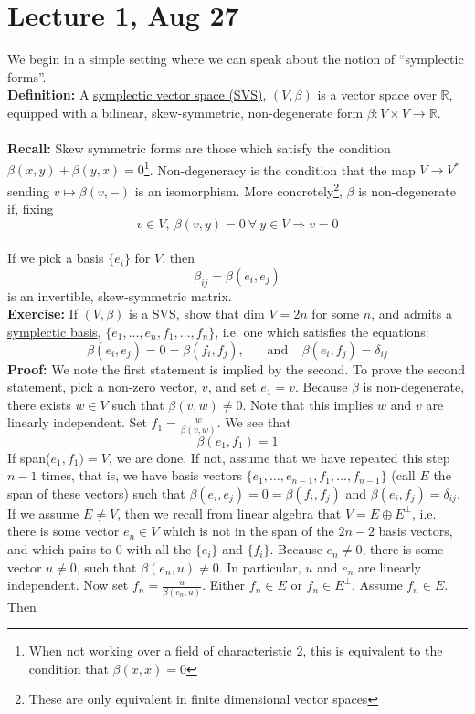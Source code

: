 \documentclass[12pt]{report}
\theoremstyle{definition}
\theoremstyle{remark}
\numberwithin{equation}{section}
\theoremstyle{definition}
\newcommand{\bb}[1]{\mathbb{#1}}
\begin{document}
\section*{Lecture 1, Aug 27}
\label{sec:1}
We begin in a simple setting where we can speak about the notion of ``symplectic forms''. \\
\textbf{Definition: } A \underline{symplectic vector space (SVS)}, $(V,\beta)$ is a vector space over $\bb R$, equipped with a bilinear, skew-symmetric, non-degenerate form $\beta: V \times V \to \bb R$. \\\\
\textbf{Recall: }Skew symmetric forms are those which satisfy the condition $\beta(x,y) + \beta (y,x) = 0$\footnote{When not working over a field of characteristic 2, this is equivalent to the condition that $\beta(x,x) = 0$}. Non-degeneracy is the condition that the map $V \to V^*$ sending $v \mapsto \beta(v,-)$ is an isomorphism. More concretely\footnote{These are only equivalent in finite dimensional vector spaces}, $\beta$ is non-degenerate if, fixing $$v \in V,\ \beta(v,y) = 0\ \forall\ y\in V \Rightarrow v = 0$$\\
If we pick a basis $\{e_i\}$ for $V$, then
$$
	\beta_{ij} = \beta(e_i,e_j)
$$
is an invertible, skew-symmetric matrix. \\
\textbf{Exercise: } If $(V,\beta)$ is a SVS, show that dim $V = 2n$ for some $n$, and admits a \underline{symplectic basis}, $\{e_1,\dots, e_n, f_1, \dots, f_n\}$, i.e. one which satisfies the equations: 
$$
	\beta(e_i,e_j) = 0 = \beta(f_i,f_j), \ \ \ \ \ \ \ \ \text{and} \ \ \ \ \ \beta(e_i,f_j) = \delta_{ij}
$$
\textbf{Proof: }We note the first statement is implied by the second. To prove the second statement, pick a non-zero vector, $v$, and set $e_1 = v$. Because $\beta$ is non-degenerate, there exists $w \in V$ such that $\beta(v,w) \ne 0$. Note that this implies $w$ and $v$ are linearly independent. Set $f_1 = \frac{w}{\beta(v,w)}$. We see that 
$$
	\beta(e_1,f_1) = 1
$$
If span($e_1,f_1) = V$, we are done. If not, assume that we have repeated this step $n-1$ times, that is, we have basis vectors $\{e_1,\dots,e_{n-1},f_1,\dots,f_{n-1}\}$ (call $E$ the span of these vectors) such that $\beta(e_i,e_j) = 0 = \beta(f_i,f_j)$ and $\beta(e_i,f_j) = \delta_{ij}$. If we assume $E \ne V$, then we recall from linear algebra that $V = E \oplus E^\perp$, i.e. there is some vector $e_n \in V$ which is not in the span of the $2n-2$ basis vectors, and which pairs to 0 with all the $\{e_i\}$ and $\{f_i\}$. Because $e_n \ne 0$, there is some vector $u \ne 0 $, such that $\beta(e_n,u) \ne 0$. In particular, $u$ and $e_n$ are linearly independent. Now set $f_n = \frac{u}{\beta(e_n,u)}$. Either $f_n \in E$ or $f_n \in E^\perp$. Assume $f_n \in E$. Then
\end{document}

